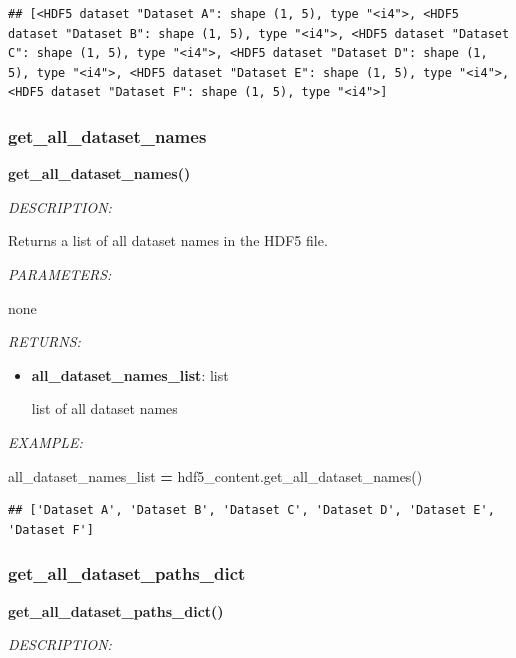 \documentclass[
]{article}
\newenvironment{Shaded}{\begin{snugshade}}{\end{snugshade}}
\newcommand{\NormalTok}[1]{#1}
\newcommand{\OperatorTok}[1]{\textcolor[rgb]{0.81,0.36,0.00}{\textbf{#1}}}
\begin{document}
\begin{verbatim}
## [<HDF5 dataset "Dataset A": shape (1, 5), type "<i4">, <HDF5 dataset "Dataset B": shape (1, 5), type "<i4">, <HDF5 dataset "Dataset C": shape (1, 5), type "<i4">, <HDF5 dataset "Dataset D": shape (1, 5), type "<i4">, <HDF5 dataset "Dataset E": shape (1, 5), type "<i4">, <HDF5 dataset "Dataset F": shape (1, 5), type "<i4">]
\end{verbatim}

\hypertarget{get_all_dataset_names}{%
\subsubsection{get\_all\_dataset\_names}\label{get_all_dataset_names}}

\textbf{get\_all\_dataset\_names()}

\emph{DESCRIPTION:}

Returns a list of all dataset names in the HDF5 file.

\emph{PARAMETERS:}

none

\emph{RETURNS:}

\begin{itemize}
\item
  \textbf{all\_dataset\_names\_list}: list

  list of all dataset names
\end{itemize}

\emph{EXAMPLE:}

\begin{Shaded}
\begin{Highlighting}[]
\NormalTok{all_dataset_names_list }\OperatorTok{=}\NormalTok{ hdf5_content.get_all_dataset_names()}
\end{Highlighting}
\end{Shaded}

\begin{verbatim}
## ['Dataset A', 'Dataset B', 'Dataset C', 'Dataset D', 'Dataset E', 'Dataset F']
\end{verbatim}

\hypertarget{get_all_dataset_paths_dict}{%
\subsubsection{get\_all\_dataset\_paths\_dict}\label{get_all_dataset_paths_dict}}

\textbf{get\_all\_dataset\_paths\_dict()}

\emph{DESCRIPTION:}
\end{document}
